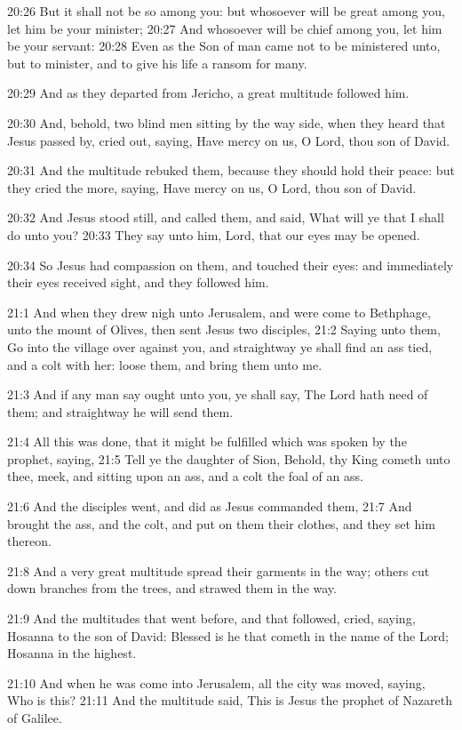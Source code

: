 20:26 But it shall not be so among you: but whosoever will be great
among you, let him be your minister; 20:27 And whosoever will be chief
among you, let him be your servant: 20:28 Even as the Son of man came
not to be ministered unto, but to minister, and to give his life a
ransom for many.

20:29 And as they departed from Jericho, a great multitude followed
him.

20:30 And, behold, two blind men sitting by the way side, when they
heard that Jesus passed by, cried out, saying, Have mercy on us, O
Lord, thou son of David.

20:31 And the multitude rebuked them, because they should hold their
peace: but they cried the more, saying, Have mercy on us, O Lord, thou
son of David.

20:32 And Jesus stood still, and called them, and said, What will ye
that I shall do unto you?  20:33 They say unto him, Lord, that our
eyes may be opened.

20:34 So Jesus had compassion on them, and touched their eyes: and
immediately their eyes received sight, and they followed him.

21:1 And when they drew nigh unto Jerusalem, and were come to
Bethphage, unto the mount of Olives, then sent Jesus two disciples,
21:2 Saying unto them, Go into the village over against you, and
straightway ye shall find an ass tied, and a colt with her: loose
them, and bring them unto me.

21:3 And if any man say ought unto you, ye shall say, The Lord hath
need of them; and straightway he will send them.

21:4 All this was done, that it might be fulfilled which was spoken by
the prophet, saying, 21:5 Tell ye the daughter of Sion, Behold, thy
King cometh unto thee, meek, and sitting upon an ass, and a colt the
foal of an ass.

21:6 And the disciples went, and did as Jesus commanded them, 21:7 And
brought the ass, and the colt, and put on them their clothes, and they
set him thereon.

21:8 And a very great multitude spread their garments in the way;
others cut down branches from the trees, and strawed them in the way.

21:9 And the multitudes that went before, and that followed, cried,
saying, Hosanna to the son of David: Blessed is he that cometh in the
name of the Lord; Hosanna in the highest.

21:10 And when he was come into Jerusalem, all the city was moved,
saying, Who is this?  21:11 And the multitude said, This is Jesus the
prophet of Nazareth of Galilee.

